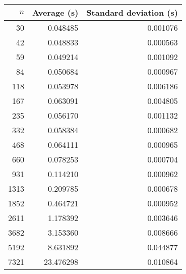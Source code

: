 \begin{tabular}{rrr}
$n$ & Average (s) & Standard deviation (s)\\\hline
30 & 0.048485 & 0.001076\\
42 & 0.048833 & 0.000563\\
59 & 0.049214 & 0.001092\\
84 & 0.050684 & 0.000967\\
118 & 0.053978 & 0.006186\\
167 & 0.063091 & 0.004805\\
235 & 0.056170 & 0.001132\\
332 & 0.058384 & 0.000682\\
468 & 0.064111 & 0.000965\\
660 & 0.078253 & 0.000704\\
931 & 0.114210 & 0.000962\\
1313 & 0.209785 & 0.000678\\
1852 & 0.464721 & 0.000952\\
2611 & 1.178392 & 0.003646\\
3682 & 3.153360 & 0.008666\\
5192 & 8.631892 & 0.044877\\
7321 & 23.476298 & 0.010864\\
\end{tabular}
